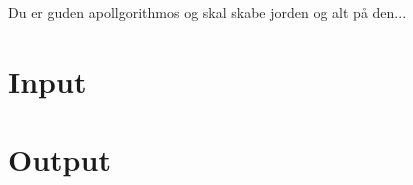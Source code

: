 Du er guden apollgorithmos og skal skabe jorden og alt på den...
\section*{Input}


\section*{Output}
